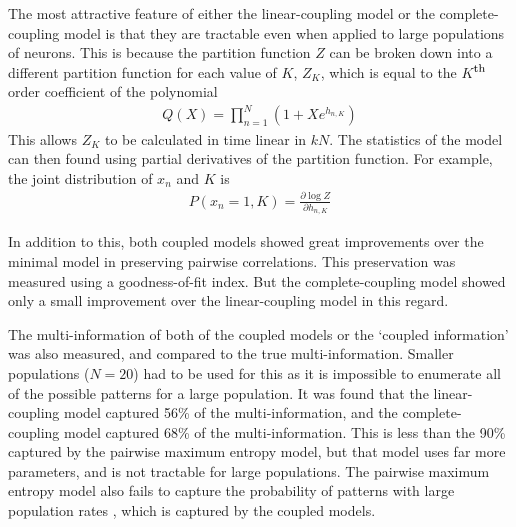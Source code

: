 \documentclass[a4paper,12pt]{article}
\theoremstyle{definition}
\newcommand{\pdiff}[2]{\frac{\partial #1}{\partial #2}} %
\newcommand{\upperth}{$^{\mbox{\footnotesize{th}}}$}%
\begin{document}
	The most attractive feature of either the linear-coupling model or the complete-coupling model is that they are tractable even when applied to large populations of neurons. This is because the partition function $Z$ can be broken down into a different partition function for each value of $K$, $Z_K$, which is equal to the $K$\upperth order coefficient of the polynomial
	\begin{align}
	Q(X) = \prod_{n=1}^N (1 + Xe^{h_{n, K}})
	\end{align}
	This allows $Z_K$ to be calculated in time linear in $kN$. The statistics of the model can then found using partial derivatives of the partition function. For example, the joint distribution of $x_n$ and $K$ is 
	\begin{align}
	P(x_n = 1, K) = \pdiff{\log Z}{h_{n,K}}
	\end{align}
	
	In addition to this, both coupled models showed great improvements over the minimal model in preserving pairwise correlations. This preservation was measured using a goodness-of-fit index. But the complete-coupling model showed only a small improvement over the linear-coupling model in this regard.
	
	The multi-information of both of the coupled models or the `coupled information' was also measured, and compared to the true multi-information. Smaller populations ($N=20$) had to be used for this as it is impossible to enumerate all of the possible patterns for a large population. It was found that the linear-coupling model captured 56\% of the multi-information, and the complete-coupling model captured 68\% of the multi-information. This is less than the 90\% captured by the pairwise maximum entropy model, but that model uses far more parameters, and is not tractable for large populations. The pairwise maximum entropy model also fails to capture the probability of patterns with large population rates \cite{tkacik}, which is captured by the coupled models. 
	
\end{document}
